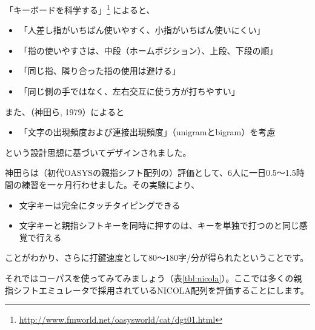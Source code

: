 「キーボードを科学する」\footnote{\url{http://www.fmworld.net/oasysworld/cat/dgt01.html}}%
によると、
\begin{itemize}
\item 「人差し指がいちばん使いやすく、小指がいちばん使いにくい」
\item 「指の使いやすさは、中段（ホームポジション）、上段、下段の順」
\item 「同じ指、隣り合った指の使用は避ける」
\item 「同じ側の手ではなく、左右交互に使う方が打ちやすい」
\end{itemize}
また、（神田ら, 1979）によると
\begin{itemize}
\item 「文字の出現頻度および連接出現頻度」（unigramとbigram）を考慮
\end{itemize}
という設計思想に基づいてデザインされました。

神田らは（初代OASYSの親指シフト配列の）評価として、6人に一日0.5～1.5時間の練習を一ヶ月行わせました。その実験により、
\begin{itemize}
\item 文字キーは完全にタッチタイピングできる
\item 文字キーと親指シフトキーを同時に押すのは、キーを単独で打つのと同じ感覚で行える
\end{itemize}
ことがわかり、さらに打鍵速度として80～180字/分が得られたということです。

それではコーパスを使ってみてみましょう（表\ref{tbl:nicola}）。ここでは多くの親指シフトエミュレータで採用されているNICOLA配列を評価することにします。

